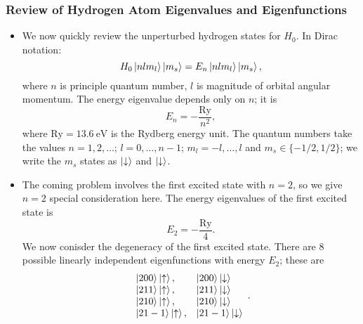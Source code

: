 \documentclass[11pt, a4paper]{article}
\newcommand{\ua}{\uparrow}  %
\newcommand{\da}{\downarrow}  %
\begin{document}
\subsubsection{Review of Hydrogen Atom Eigenvalues and Eigenfunctions}
\begin{itemize}
	\item We now quickly review the unperturbed hydrogen states for $ H_{0} $. In Dirac notation:
	\begin{equation*}
		H_{0}\ket{nlm_{l}}\ket{m_{s}} = E_{n} \ket{nlm_{l}}\ket{m_{s}},
	\end{equation*}
	where $ n $ is principle quantum number, $ l $ is magnitude of orbital angular momentum.  The energy eigenvalue depends only on $ n $; it is
	\begin{equation*}
		E_{n} = - \frac{\mathrm{Ry}}{n^{2}},
	\end{equation*}
	where $\mathrm{Ry} = \SI{13.6}{\electronvolt} $ is the Rydberg energy unit. The quantum numbers take the values $ n = 1, 2, \ldots $; $ l = 0, \ldots, n-1 $; $ m_{l} = -l, \ldots, l $ and $ m_{s} \in \{-1/2, 1/2\} $; we write the $ m_{s} $ states as $ \ket{\da} $ and $ \ket{\da} $. 
	
	\item The coming problem involves the first excited state with $ n = 2 $, so we give $ n = 2 $ special consideration here. The energy eigenvalues of the first excited state is
	\begin{equation*}
		E_{2} = - \frac{\mathrm{Ry}}{4}.
	\end{equation*}
	We now conisder the degeneracy of the first excited state. There are 8 possible linearly independent eigenfunctions with energy $ E_{2} $; these are
	\[
	\begin{array}{ll}
		\ket{200}\ket{\ua}, & \ket{200}\ket{\da}\\
		\ket{211}\ket{\ua}, & \ket{211}\ket{\da}\\
		\ket{210}\ket{\ua}, & \ket{210}\ket{\da}\\
		\ket{21-1}\ket{\ua}, & \ket{21-1}\ket{\da}
	\end{array}.
	\]
	

\end{itemize}
\end{document}
